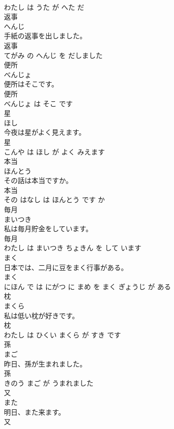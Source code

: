 \documentclass[8pt]{extreport}
\begin{document}
\begin{CJK}{UTF8}{min}
\\	わたし は うた が へた だ			
\\	返事	
\\	へんじ			
\\	手紙の返事を出しました。	
\\	返事 
\\	てがみ の へんじ を だしました			
\\	便所	
\\	べんじょ			
\\	便所はそこです。	
\\	便所 
\\	べんじょ は そこ です			
\\	星	
\\	ほし			
\\	今夜は星がよく見えます。	
\\	星 
\\	こんや は ほし が よく みえます			
\\	本当	
\\	ほんとう			
\\	その話は本当ですか。	
\\	本当 
\\	その はなし は ほんとう です か			
\\	毎月	
\\	まいつき			
\\	私は毎月貯金をしています。	
\\	毎月 
\\	わたし は まいつき ちょきん を して います			
\\	まく	
\\	日本では、二月に豆をまく行事がある。	
\\	まく 
\\	にほん で は にがつ に まめ を まく ぎょうじ が ある			
\\	枕	
\\	まくら			
\\	私は低い枕が好きです。	
\\	枕 
\\	わたし は ひくい まくら が すき です			
\\	孫	
\\	まご			
\\	昨日、孫が生まれました。	
\\	孫 
\\	きのう まご が うまれました			
\\	又	
\\	また			
\\	明日、また来ます。	
\\	又 

\end{CJK}
\end{document}
